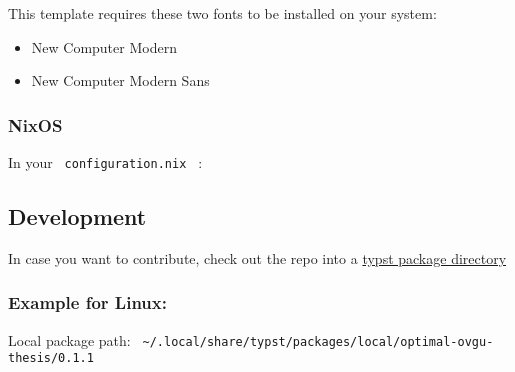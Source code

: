This template requires these two fonts to be installed on your system:

\begin{itemize}
\tightlist
\item
  New Computer Modern
\item
  New Computer Modern Sans
\end{itemize}

\subsubsection{NixOS}\label{nixos}

In your \texttt{\ configuration.nix\ } :

\begin{Shaded}
\begin{Highlighting}[]
\OperatorTok{;} \OperatorTok{[}
  \OperatorTok{]} \OperatorTok{++}
\end{Highlighting}
\end{Shaded}

\subsection{Development}\label{development}

In case you want to contribute, check out the repo into a
\href{https://github.com/typst/packages?tab=readme-ov-file\#local-packages}{typst
package directory}

\subsubsection{Example for Linux:}\label{example-for-linux}

Local package path:
\texttt{\ \textasciitilde{}/.local/share/typst/packages/local/optimal-ovgu-thesis/0.1.1\ }

\begin{Shaded}
\begin{Highlighting}[]
 
\end{Highlighting}
\end{Shaded}

